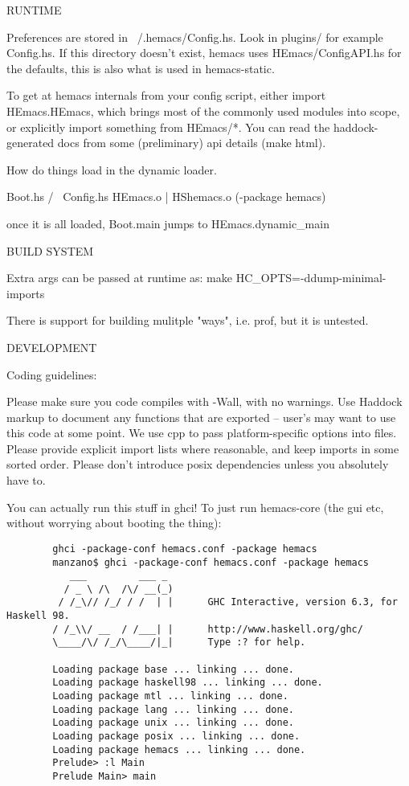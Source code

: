 RUNTIME

Preferences are stored in ~/.hemacs/Config.hs. Look in plugins/ for
example Config.hs. If this directory doesn't exist, hemacs uses
HEmacs/ConfigAPI.hs for the defaults, this is also what is used in
hemacs-static.

To get at hemacs internals from your config script, either import
HEmacs.HEmacs, which brings most of the commonly used modules into
scope, or explicitly import something from HEmacs/*. You can read the
haddock-generated docs from some (preliminary) api details (make
html).

How do things load in the dynamic loader.
        
           Boot.hs
          /      \
      Config.hs HEmacs.o
                  |
                HShemacs.o (-package hemacs)

once it is all loaded, Boot.main jumps to HEmacs.dynamic\_main

BUILD SYSTEM

Extra args can be passed at runtime as: make HC\_OPTS=-ddump-minimal-imports

There is support for building mulitple "ways", i.e. prof, but it is
untested.

DEVELOPMENT

Coding guidelines:

Please make sure you code compiles with -Wall, with no warnings. Use
Haddock markup to document any functions that are exported -- user's
may want to use this code at some point. We use cpp to pass
platform-specific options into files. Please provide explicit import
lists where reasonable, and keep imports in some sorted order.
Please don't introduce posix dependencies unless you absolutely have
to.

You can actually run this stuff in ghci! To just run hemacs-core (the gui etc,
without worrying about booting the thing):

\begin{verbatim}
        ghci -package-conf hemacs.conf -package hemacs
        manzano$ ghci -package-conf hemacs.conf -package hemacs
           ___         ___ _
          / _ \ /\  /\/ __(_)
         / /_\// /_/ / /  | |      GHC Interactive, version 6.3, for Haskell 98.
        / /_\\/ __  / /___| |      http://www.haskell.org/ghc/
        \____/\/ /_/\____/|_|      Type :? for help.

        Loading package base ... linking ... done.
        Loading package haskell98 ... linking ... done.
        Loading package mtl ... linking ... done.
        Loading package lang ... linking ... done.
        Loading package unix ... linking ... done.
        Loading package posix ... linking ... done.
        Loading package hemacs ... linking ... done.
        Prelude> :l Main
        Prelude Main> main
\end{verbatim}

